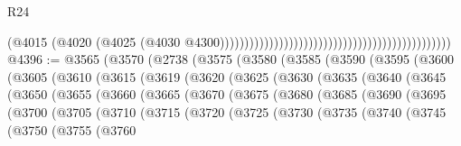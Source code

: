 \begin{lexlean}{R24}
\begin{coremodule}
                                                                                          (@4015
                                                                                            (@4020
                                                                                              (@4025
                                                                                                (@4030
                                                                                                  @4300)))))))))))))))))))))))))))))))))))))))))))))))
@4396 := @3565
    (@3570
      (@2738
        (@3575
          (@3580
            (@3585
              (@3590
                (@3595
                  (@3600
                    (@3605
                      (@3610
                        (@3615
                          (@3619
                            (@3620
                              (@3625
                                (@3630
                                  (@3635
                                    (@3640
                                      (@3645
                                        (@3650
                                          (@3655
                                            (@3660
                                              (@3665
                                                (@3670
                                                  (@3675
                                                    (@3680
                                                      (@3685
                                                        (@3690
                                                          (@3695
                                                            (@3700
                                                              (@3705
                                                                (@3710
                                                                  (@3715
                                                                    (@3720
                                                                      (@3725
                                                                        (@3730
                                                                          (@3735
                                                                            (@3740
                                                                              (@3745
                                                                                (@3750
                                                                                  (@3755
                                                                                    (@3760

\end{coremodule}
\end{lexlean}
